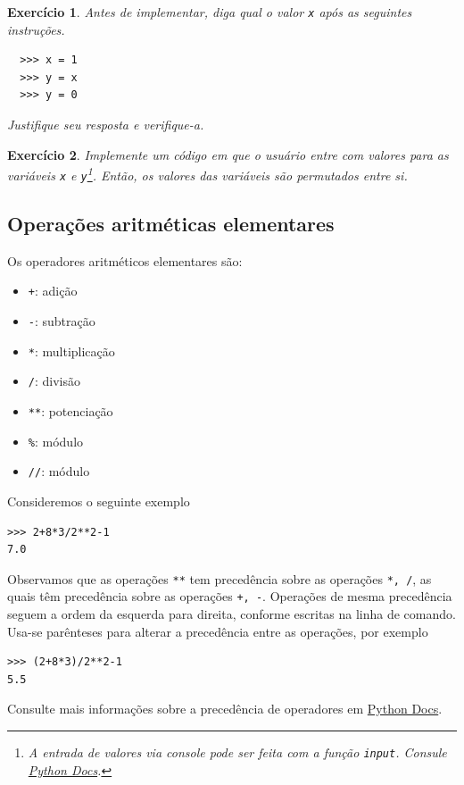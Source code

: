 \documentclass[12pt]{article}
\newtheorem{exr}{Exercício}[section]
\begin{document}
\begin{exr}
  Antes de implementar, diga qual o valor \lstinline+x+ após as seguintes instruções.
  \begin{lstlisting}
  >>> x = 1
  >>> y = x
  >>> y = 0
  \end{lstlisting}
  Justifique seu resposta e verifique-a.
\end{exr}

\begin{exr}
  Implemente um código em que o usuário entre com valores para as variáveis \lstinline+x+ e \lstinline+y+\footnote{A entrada de valores via console pode ser feita com a função {\python} \lstinline+input+. Consule \href{https://docs.python.org/3/library/functions.html\#input}{Python Docs}.}. Então, os valores das variáveis são permutados entre si.
\end{exr}


\subsection{Operações aritméticas elementares}

Os operadores aritméticos elementares são:
\begin{itemize}
\item[]\lstinline-+-: adição
\item[]\lstinline+-+: subtração
\item[]\lstinline+*+: multiplicação
\item[]\lstinline+/+: divisão
\item[]\lstinline+**+: potenciação
\item[]\lstinline+%+: módulo
\item[]\lstinline+//+: módulo
\end{itemize}

Consideremos o seguinte exemplo
\begin{lstlisting}
>>> 2+8*3/2**2-1
7.0
\end{lstlisting}
Observamos que as operações \lstinline+**+ tem precedência sobre as operações \lstinline+*, /+, as quais têm precedência sobre as operações \lstinline!+, -!. Operações de mesma precedência seguem a ordem da esquerda para direita, conforme escritas na linha de comando. Usa-se parênteses para alterar a precedência entre as operações, por exemplo
\begin{lstlisting}
>>> (2+8*3)/2**2-1
5.5
\end{lstlisting}
Consulte mais informações sobre a precedência de operadores em \href{https://docs.python.org/3/reference/expressions.html#operator-precedence}{Python Docs}.
\end{document}
